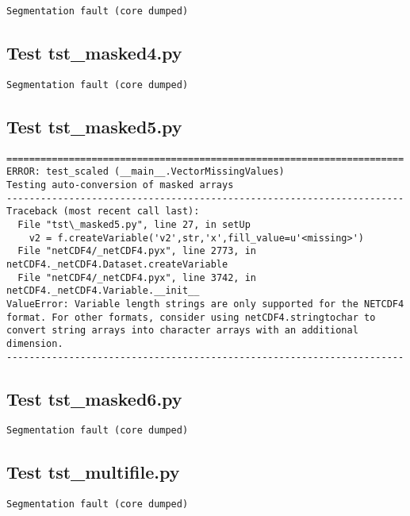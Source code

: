 \begin{verbatim}
Segmentation fault (core dumped)
\end{verbatim}

\subsection{Test tst\_masked4.py}

\begin{verbatim}
Segmentation fault (core dumped)
\end{verbatim}

\subsection{Test tst\_masked5.py}

\begin{verbatim}
======================================================================
ERROR: test_scaled (__main__.VectorMissingValues)
Testing auto-conversion of masked arrays
----------------------------------------------------------------------
Traceback (most recent call last):
  File "tst\_masked5.py", line 27, in setUp
    v2 = f.createVariable('v2',str,'x',fill_value=u'<missing>')
  File "netCDF4/_netCDF4.pyx", line 2773, in netCDF4._netCDF4.Dataset.createVariable
  File "netCDF4/_netCDF4.pyx", line 3742, in netCDF4._netCDF4.Variable.__init__
ValueError: Variable length strings are only supported for the NETCDF4 format. For other formats, consider using netCDF4.stringtochar to convert string arrays into character arrays with an additional dimension.
----------------------------------------------------------------------

\end{verbatim}

\subsection{Test tst\_masked6.py}

\begin{verbatim}
Segmentation fault (core dumped)
\end{verbatim}

\subsection{Test tst\_multifile.py}

\begin{verbatim}
Segmentation fault (core dumped)
\end{verbatim}

